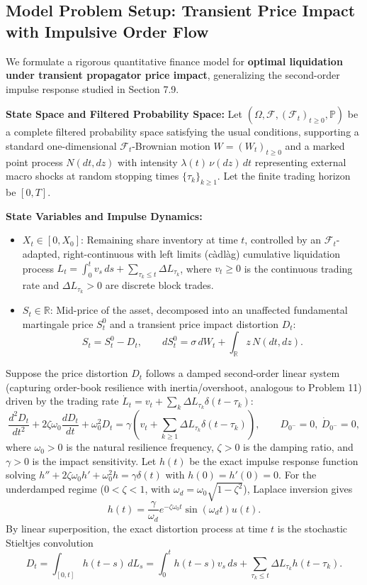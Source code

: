 \documentclass[11pt, letterpaper]{article}
\theoremstyle{definition}
\theoremstyle{remark}
\newcommand{\R}{\mathbb{R}}
\newcommand{\Prob}{\mathbb{P}}
\newcommand{\F}{\mathcal{F}}
\begin{document}
\subsection{Model Problem Setup: Transient Price Impact with Impulsive Order Flow}
We formulate a rigorous quantitative finance model for \textbf{optimal liquidation under transient propagator price impact}, generalizing the second-order impulse response studied in Section 7.9.

\textbf{State Space and Filtered Probability Space:} Let $(\Omega, \F, (\F_t)_{t \ge 0}, \Prob)$ be a complete filtered probability space satisfying the usual conditions, supporting a standard one-dimensional $\F_t$-Brownian motion $W = (W_t)_{t \ge 0}$ and a marked point process $N(dt, dz)$ with intensity $\lambda(t)\,\nu(dz)\,dt$ representing external macro shocks at random stopping times $\{\tau_k\}_{k \ge 1}$. Let the finite trading horizon be $[0, T]$.

\textbf{State Variables and Impulse Dynamics:}
\begin{itemize}
    \item $X_t \in [0, X_0]$: Remaining share inventory at time $t$, controlled by an $\F_t$-adapted, right-continuous with left limits (c\`adl\`ag) cumulative liquidation process $L_t = \int_0^t v_s\,ds + \sum_{\tau_k \le t} \Delta L_{\tau_k}$, where $v_t \ge 0$ is the continuous trading rate and $\Delta L_{\tau_k} > 0$ are discrete block trades.
    \item $S_t \in \R$: Mid-price of the asset, decomposed into an unaffected fundamental martingale price $S_t^0$ and a transient price impact distortion $D_t$:
    \[
        S_t = S_t^0 - D_t, \qquad dS_t^0 = \sigma\,dW_t + \int_{\R} z\,N(dt, dz).
    \]
\end{itemize}
Suppose the price distortion $D_t$ follows a damped second-order linear system (capturing order-book resilience with inertia/overshoot, analogous to Problem 11) driven by the trading rate $\dot{L}_t = v_t + \sum_k \Delta L_{\tau_k}\delta(t - \tau_k)$:
\[
    \frac{d^2 D_t}{dt^2} + 2\zeta \omega_0 \frac{d D_t}{dt} + \omega_0^2 D_t = \gamma \left(v_t + \sum_{k \ge 1} \Delta L_{\tau_k} \delta(t - \tau_k)\right), \qquad D_{0^-} = 0,\ \dot{D}_{0^-} = 0,
\]
where $\omega_0 > 0$ is the natural resilience frequency, $\zeta > 0$ is the damping ratio, and $\gamma > 0$ is the impact sensitivity. Let $h(t)$ be the exact impulse response function solving $h'' + 2\zeta\omega_0 h' + \omega_0^2 h = \gamma \delta(t)$ with $h(0)=h'(0)=0$. For the underdamped regime ($0 < \zeta < 1$, with $\omega_d = \omega_0\sqrt{1 - \zeta^2}$), Laplace inversion gives
\[
    h(t) = \frac{\gamma}{\omega_d} e^{-\zeta \omega_0 t}\sin(\omega_d t) u(t).
\]
By linear superposition, the exact distortion process at time $t$ is the stochastic Stieltjes convolution
\[
    D_t = \int_{[0, t]} h(t - s)\,dL_s = \int_0^t h(t - s)v_s\,ds + \sum_{\tau_k \le t} \Delta L_{\tau_k} h(t - \tau_k).
\]
\end{document}
